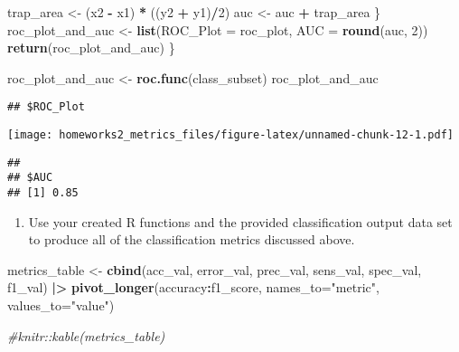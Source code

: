 \documentclass[
]{article}
\newenvironment{Shaded}{\begin{snugshade}}{\end{snugshade}}
\newcommand{\AttributeTok}[1]{\textcolor[rgb]{0.13,0.29,0.53}{#1}}
\newcommand{\CommentTok}[1]{\textcolor[rgb]{0.56,0.35,0.01}{\textit{#1}}}
\newcommand{\DecValTok}[1]{\textcolor[rgb]{0.00,0.00,0.81}{#1}}
\newcommand{\FunctionTok}[1]{\textcolor[rgb]{0.13,0.29,0.53}{\textbf{#1}}}
\newcommand{\NormalTok}[1]{#1}
\newcommand{\OtherTok}[1]{\textcolor[rgb]{0.56,0.35,0.01}{#1}}
\newcommand{\SpecialCharTok}[1]{\textcolor[rgb]{0.81,0.36,0.00}{\textbf{#1}}}
\newcommand{\StringTok}[1]{\textcolor[rgb]{0.31,0.60,0.02}{#1}}
\providecommand{\tightlist}{%
  \setlength{\itemsep}{0pt}\setlength{\parskip}{0pt}}
\begin{document}
\begin{Shaded}
\begin{Highlighting}[]
\NormalTok{        trap\_area }\OtherTok{\textless{}{-}}\NormalTok{ (x2 }\SpecialCharTok{{-}}\NormalTok{ x1) }\SpecialCharTok{*}\NormalTok{ ((y2 }\SpecialCharTok{+}\NormalTok{ y1)}\SpecialCharTok{/}\DecValTok{2}\NormalTok{)}
\NormalTok{        auc }\OtherTok{\textless{}{-}}\NormalTok{ auc }\SpecialCharTok{+}\NormalTok{ trap\_area}
\NormalTok{    \}}
\NormalTok{    roc\_plot\_and\_auc }\OtherTok{\textless{}{-}} \FunctionTok{list}\NormalTok{(}\AttributeTok{ROC\_Plot =}\NormalTok{ roc\_plot, }\AttributeTok{AUC =} \FunctionTok{round}\NormalTok{(auc, }\DecValTok{2}\NormalTok{))}
    \FunctionTok{return}\NormalTok{(roc\_plot\_and\_auc)}
\NormalTok{\}}

\NormalTok{roc\_plot\_and\_auc }\OtherTok{\textless{}{-}} \FunctionTok{roc.func}\NormalTok{(class\_subset)}
\NormalTok{roc\_plot\_and\_auc}
\end{Highlighting}
\end{Shaded}

\begin{verbatim}
## $ROC_Plot
\end{verbatim}

\texttt{[image: homeworks2\_metrics\_files/figure-latex/unnamed-chunk-12-1.pdf]}

\begin{verbatim}
## 
## $AUC
## [1] 0.85
\end{verbatim}

\begin{enumerate}
\def\labelenumi{\arabic{enumi}.}
\setcounter{enumi}{10}
\tightlist
\item
  Use your created R functions and the provided classification output
  data set to produce all of the classification metrics discussed above.
\end{enumerate}

\begin{Shaded}
\begin{Highlighting}[]
\NormalTok{metrics\_table }\OtherTok{\textless{}{-}} \FunctionTok{cbind}\NormalTok{(acc\_val, error\_val, prec\_val, sens\_val, spec\_val, f1\_val) }\SpecialCharTok{|\textgreater{}}
  \FunctionTok{pivot\_longer}\NormalTok{(accuracy}\SpecialCharTok{:}\NormalTok{f1\_score,}
               \AttributeTok{names\_to=}\StringTok{"metric"}\NormalTok{,}
               \AttributeTok{values\_to=}\StringTok{"value"}\NormalTok{)}

\CommentTok{\#knitr::kable(metrics\_table)}
\end{Highlighting}
\end{Shaded}
\end{document}
